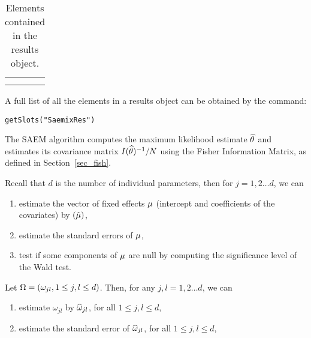 \begin{center}
\begin{longtable}{r p{12cm}}
{\sf } & \\
\hline
\\
\caption{Elements contained in the results object.} \label{tab:resSlots}
\end{longtable} 
\end{center}
A full list of all the elements in a results object can be obtained by the command:
\begin{verbatim}
getSlots("SaemixRes")
\end{verbatim}



The SAEM algorithm computes the maximum likelihood estimate ${\widehat{\theta}}$ and estimates its covariance matrix $I({{\widehat{\theta}}})^{-1}/N$ using the Fisher Information Matrix, as defined in Section~\ref{sec_fish}.

Recall that $d$ is the number of individual parameters, then for $j=1,2\ldots d$, we can
\begin{enumerate}
\item estimate the vector of fixed effects $\fixed_effect$ (intercept and coefficients of the covariates) by $(\hat{\fixed_effect})$,
\item estimate the standard errors of $\fixed_effect$,
\item test if some components of $\fixed_effect$ are null by computing the significance level of the Wald test.
\end{enumerate}

Let ${\Omega}=(\omega_{jl}, 1\leq j,l \leq d)$. Then, for any $j,l=1,2\ldots d$, we can
\begin{enumerate}
\item estimate $\omega_{jl}$ by ${\widehat{\omega}}_{jl}$, for all $1\leq j,l \leq d$,
\item estimate the standard error of ${\widehat{\omega}}_{jl}$, for all $1\leq j,l \leq d$,
\end{enumerate}


